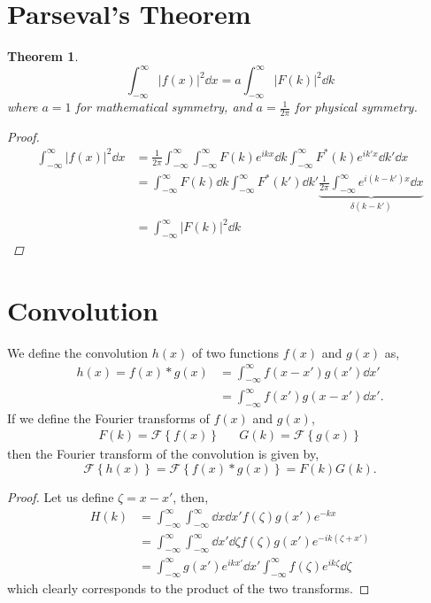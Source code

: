\documentclass{book}
\newtheorem*{theorem}{Theorem}
\begin{document}
\section{Parseval's Theorem}
\begin{theorem}
\begin{equation}
	\boxed{\int_{-\infty}^{\infty} \left|f(x)\right|^2\dd{x} = a\int_{-\infty}^{\infty}\left|F(k)\right|^2\dd{k}}
\end{equation}
where $a=1$ for mathematical symmetry, and $a= \frac{1}{2\pi}$ for physical symmetry.
\begin{proof}
	\begin{equation}
		\begin{split}
		\int_{-\infty}^{\infty}\left|f(x)\right|^2\dd{x} &= \frac{1}{2\pi}\int_{-\infty}^{\infty}\int_{-\infty}^{\infty}F(k)e^{ikx}\dd{k}\int_{-\infty}^{\infty}F^*(k)e^{ik'x}\dd{k'}\dd{x}\\
		& = \int_{-\infty}^{\infty}F(k)\dd{k}\int_{-\infty}^{\infty}F^*(k')\dd{k'}\underbrace{\frac{1}{2\pi}\int_{-\infty}^{\infty}e^{i(k-k')x}\dd{x}}_{\delta(k-k')} \\
		& = \int_{-\infty}^{\infty}\left|F(k)\right|^2 \dd{k}
		\end{split}
	\end{equation}
\end{proof}
\end{theorem}
\section{Convolution}
We define the convolution $h(x)$ of two functions $f(x)$ and $g(x)$ as,
\begin{equation}
	\begin{split}
		h(x) = f(x) * g(x) & = \int_{-\infty}^{\infty}f(x - x')g(x')\dd{x'} \\
		& = \int_{-\infty}^{\infty}f(x')g(x - x')\dd{x'}.
	\end{split}
\end{equation}
If we define the Fourier transforms of $f(x)$ and $g(x)$,
\begin{align}
	F(k) = \mathscr{F}\left\{f(x)\right\} && G(k) = \mathscr{F}\left\{g(x)\right\}
\end{align}
then the Fourier transform of the convolution is given by,
\begin{equation}
	\mathscr{F}\left\{h(x)\right\} = \mathscr{F}\left\{f(x) * g(x)\right\} = F(k)G(k).
\end{equation}
\begin{proof}
	Let us define $\zeta = x - x'$, then,
	\begin{equation}
		\begin{split}
			H(k) & = \int_{-\infty}^{\infty}\int_{-\infty}^{\infty}\dd{x}\dd{x'}f(\zeta)g(x')e^{-kx} \\
			& = \int_{-\infty}^{\infty}\int_{-\infty}^{\infty} \dd{x'}\dd{\zeta}f(\zeta)g(x')e^{-ik(\zeta+x')} \\
			& = \int_{-\infty}^{\infty}g(x')e^{ikx'}\dd{x'}\int_{-\infty}^{\infty}f(\zeta)e^{ik\zeta}\dd{\zeta}
		\end{split}
	\end{equation}
	which clearly corresponds to the product of the two transforms.
\end{proof}
\end{document}

